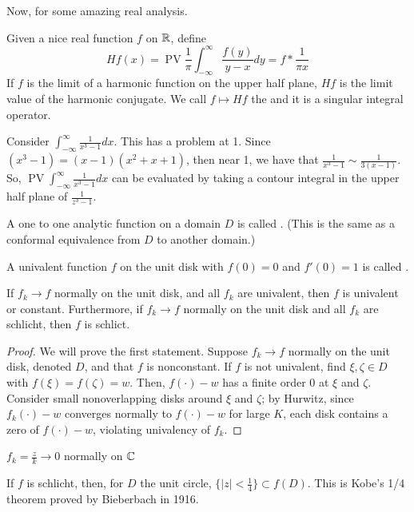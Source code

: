 \documentclass[11pt,leqno,oneside]{amsart}
\numberwithin{thm}{section}
\newcommand{\PV}{\operatorname{PV}}
\begin{document}
  Now, for some amazing real analysis.
  \begin{defn}
    Given a nice real function $f$ on ${\mathbb R}$, define \[
      H f(x) = \PV \frac{1}{\pi} \int_{-\infty}^\infty
      \frac{f(y)}{y-x}dy = f * \frac{1}{\pi x}
    \]
    If $f$ is the limit of a harmonic function on the upper half
    plane, $Hf$ is the limit value of the harmonic conjugate. We call
    $f \mapsto Hf$ the  and it is a singular
    integral operator.
  \end{defn}
  \begin{example}
    Consider $\int_{-\infty}^\infty \frac{1}{x^3-1}dx$. This has a
    problem at 1. Since $(x^3-1) = (x-1)(x^2+x+1)$, then near 1, we
    have that $\frac{1}{x^3-1} \sim \frac{1}{3(x-1)}$. So, $\PV
    \int_{-\infty}^\infty \frac{1}{x^3-1}dx$ can be evaluated by
    taking a contour integral in the upper half plane of
    $\frac{1}{z^3-1}$.
  \end{example}
  \begin{defn}
    A one to one analytic function on a domain $D$ is called
    . (This is the same as a conformal equivalence
    from $D$ to another domain.)
  \end{defn}
  \begin{defn}
    A univalent function $f$ on the unit disk with $f(0) = 0$ and
    $f'(0) = 1$ is called .
  \end{defn}
  \begin{prop}
    If $f_k \to f$ normally on the unit disk, and all $f_k$ are
    univalent, then $f$ is univalent or constant. Furthermore, if $f_k
    \to f$ normally on the unit disk and all $f_k$ are schlicht, then
    $f$ is schlict.
  \end{prop}
  \begin{proof}
    We will prove the first statement. Suppose $f_k \to f$ normally on
    the unit disk, denoted $D$, and that $f$ is nonconstant. If $f$ is
    not univalent, find $\xi, \zeta \in D$ with $f(\xi) = f(\zeta) =
    w$. Then, $f(\cdot)-w$ has a finite order 0 at $\xi$ and
    $\zeta$. Consider small nonoverlapping disks around $\xi$ and
    $\zeta$; by Hurwitz, since $f_k(\cdot)-w$ converges normally to
    $f(\cdot)-w$ for large $K$, each disk contains a zero of
    $f(\cdot)-w$, violating univalency of $f_k$.
  \end{proof}
  \begin{example}
    $f_k = \frac{z}{k} \to 0$ normally on ${\mathbb C}$
  \end{example}
  \begin{prop}
    If $f$ is schlicht, then, for $D$ the unit circle, $\{|z| <
    \frac{1}{4}\} \subset f(D)$. This is Kobe's 1/4 theorem proved by
    Bieberbach in 1916.
  \end{prop}
\end{document}
